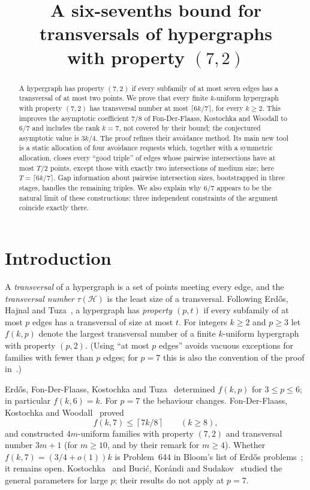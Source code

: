 \documentclass[11pt]{article}
\title{A six-sevenths bound for transversals of hypergraphs\\ with property $(7,2)$}
\author{}
\date{}
\numberwithin{equation}{section}
\theoremstyle{definition}
\theoremstyle{remark}
\newcommand{\HH}{\mathcal H}
\newcommand{\ceil}[1]{\left\lceil #1\right\rceil}
\begin{document}
\maketitle

\begin{abstract}
A hypergraph has property $(7,2)$ if every subfamily of at most seven
edges has a transversal of at most two points. We prove that every
finite $k$-uniform hypergraph with property $(7,2)$ has transversal
number at most $\lceil 6k/7\rceil$, for every $k\ge2$. This improves the
asymptotic coefficient $7/8$ of Fon-Der-Flaass, Kostochka and Woodall
to $6/7$ and includes the rank $k=7$, not covered by their bound; the
conjectured asymptotic value is $3k/4$. The proof refines their
avoidance method. Its main new tool is a static allocation of four
avoidance requests which, together with a symmetric allocation, closes
every ``good triple'' of edges whose pairwise intersections have at most
$T/2$ points, except those with exactly two intersections of medium
size; here $T=\lceil6k/7\rceil$. Gap information about pairwise
intersection sizes, bootstrapped in three stages, handles the remaining
triples. We also explain why $6/7$ appears to be the natural
limit of these constructions: three independent constraints of the
argument coincide exactly there.
\end{abstract}

\section{Introduction}\label{sec:intro}

A \emph{transversal} of a hypergraph is a set of points meeting every
edge, and the \emph{transversal number} $\tau(\HH)$ is the least size
of a transversal. Following Erd\H{o}s, Hajnal and Tuza~\cite{EHT}, a
hypergraph has \emph{property $(p,t)$} if every subfamily of at most $p$
edges has a transversal of size at most $t$. For integers $k\ge2$ and
$p\ge3$ let $f(k,p)$ denote the largest transversal number of a finite
$k$-uniform hypergraph with property $(p,2)$. (Using ``at most $p$
edges'' avoids vacuous exceptions for families with fewer than $p$
edges; for $p=7$ this is also the convention of the proof
in~\cite{FKW}.)

Erd\H{o}s, Fon-Der-Flaass, Kostochka and Tuza~\cite{EFKT} determined
$f(k,p)$ for $3\le p\le6$; in particular $f(k,6)=k$. For $p=7$ the
behaviour changes. Fon-Der-Flaass, Kostochka and Woodall~\cite{FKW}
proved
\[
 f(k,7)\le\ceil{7k/8}\qquad(k\ge8),
\]
and constructed $4m$-uniform families with property $(7,2)$ and
transversal number $3m+1$ (for $m\ge10$, and by their remark for $m\ge4$).
Whether $f(k,7)=(3/4+o(1))k$ is Problem~644 in Bloom's list of Erd\H{o}s
problems~\cite{Bloom}; it remains open. Kostochka~\cite{Kostochka} and
Buci\'c, Kor\'andi and Sudakov~\cite{BKS} studied the general parameters
for large $p$; their results do not apply at $p=7$.
\end{document}
